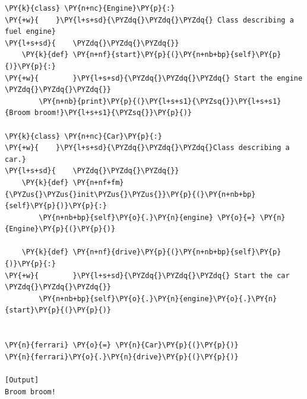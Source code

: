 \begin{Verbatim}[label=\makebox{\url{https://github.com/lucabaldini/cmepda/tree/master/slides/latex/snippets/composition.py}},commandchars=\\\{\}]
\PY{k}{class} \PY{n+nc}{Engine}\PY{p}{:}
\PY{+w}{    }\PY{l+s+sd}{\PYZdq{}\PYZdq{}\PYZdq{} Class describing a fuel engine}
\PY{l+s+sd}{    \PYZdq{}\PYZdq{}\PYZdq{}}
    \PY{k}{def} \PY{n+nf}{start}\PY{p}{(}\PY{n+nb+bp}{self}\PY{p}{)}\PY{p}{:}
\PY{+w}{        }\PY{l+s+sd}{\PYZdq{}\PYZdq{}\PYZdq{} Start the engine \PYZdq{}\PYZdq{}\PYZdq{}}
        \PY{n+nb}{print}\PY{p}{(}\PY{l+s+s1}{\PYZsq{}}\PY{l+s+s1}{Broom broom!}\PY{l+s+s1}{\PYZsq{}}\PY{p}{)}

\PY{k}{class} \PY{n+nc}{Car}\PY{p}{:}
\PY{+w}{    }\PY{l+s+sd}{\PYZdq{}\PYZdq{}\PYZdq{}Class describing a car.}
\PY{l+s+sd}{    \PYZdq{}\PYZdq{}\PYZdq{}}
    \PY{k}{def} \PY{n+nf+fm}{\PYZus{}\PYZus{}init\PYZus{}\PYZus{}}\PY{p}{(}\PY{n+nb+bp}{self}\PY{p}{)}\PY{p}{:}
        \PY{n+nb+bp}{self}\PY{o}{.}\PY{n}{engine} \PY{o}{=} \PY{n}{Engine}\PY{p}{(}\PY{p}{)}
      
    \PY{k}{def} \PY{n+nf}{drive}\PY{p}{(}\PY{n+nb+bp}{self}\PY{p}{)}\PY{p}{:}
\PY{+w}{        }\PY{l+s+sd}{\PYZdq{}\PYZdq{}\PYZdq{} Start the car \PYZdq{}\PYZdq{}\PYZdq{}}
        \PY{n+nb+bp}{self}\PY{o}{.}\PY{n}{engine}\PY{o}{.}\PY{n}{start}\PY{p}{(}\PY{p}{)}
    

\PY{n}{ferrari} \PY{o}{=} \PY{n}{Car}\PY{p}{(}\PY{p}{)}
\PY{n}{ferrari}\PY{o}{.}\PY{n}{drive}\PY{p}{(}\PY{p}{)}

[Output]
Broom broom!
\end{Verbatim}